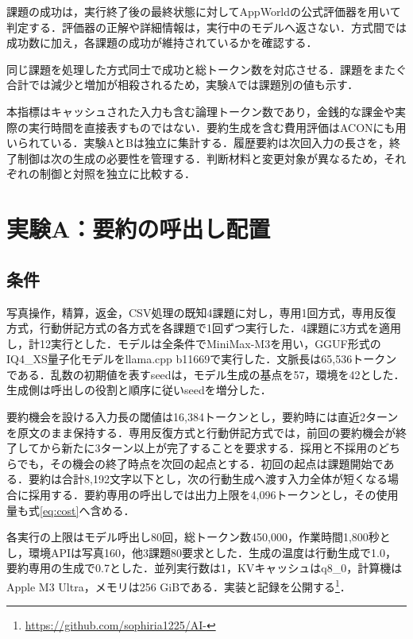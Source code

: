 \documentclass[letter]{ieicej}
\begin{document}
課題の成功は，実行終了後の最終状態に対してAppWorld\cite{trivedi2024appworld}の公式評価器を用いて判定する．評価器の正解や詳細情報は，実行中のモデルへ返さない．方式間では成功数に加え，各課題の成功が維持されているかを確認する．

同じ課題を処理した方式同士で成功と総トークン数を対応させる．課題をまたぐ合計では減少と増加が相殺されるため，実験Aでは課題別の値も示す．

本指標はキャッシュされた入力も含む論理トークン数であり，金銭的な課金や実際の実行時間を直接表すものではない\cite{xu2026tokenpilot}．要約生成を含む費用評価はACON\cite{kang2026acon}にも用いられている．実験AとBは独立に集計する．履歴要約は次回入力の長さを，終了制御は次の生成の必要性を管理する．判断材料と変更対象が異なるため，それぞれの制御と対照を独立に比較する．

\section{実験A：要約の呼出し配置}

\subsection{条件}

写真操作，精算，返金，CSV処理の既知4課題に対し，専用1回方式，専用反復方式，行動併記方式の各方式を各課題で1回ずつ実行した．4課題に3方式を適用し，計12実行とした．モデルは全条件でMiniMax-M3を用い，GGUF形式のIQ4\_XS量子化モデルをllama.cpp b11669で実行した．文脈長は65,536トークンである．乱数の初期値を表すseedは，モデル生成の基点を57，環境を42とした．生成側は呼出しの役割と順序に従いseedを増分した．

要約機会を設ける入力長の閾値は16,384トークンとし，要約時には直近2ターンを原文のまま保持する．専用反復方式と行動併記方式では，前回の要約機会が終了してから新たに3ターン以上が完了することを要求する．採用と不採用のどちらでも，その機会の終了時点を次回の起点とする．初回の起点は課題開始である．要約は合計8,192文字以下とし，次の行動生成へ渡す入力全体が短くなる場合に採用する．要約専用の呼出しでは出力上限を4,096トークンとし，その使用量も式\eqref{eq:cost}へ含める．

各実行の上限はモデル呼出し80回，総トークン数450,000，作業時間1,800秒とし，環境APIは写真160，他3課題80要求とした．生成の温度は行動生成で1.0，要約専用の生成で0.7とした．並列実行数は1，KVキャッシュはq8\_0，計算機はApple M3 Ultra，メモリは256 GiBである．実装と記録を公開する\footnote{\url{https://github.com/sophiria1225/AI-}}．
\end{document}

